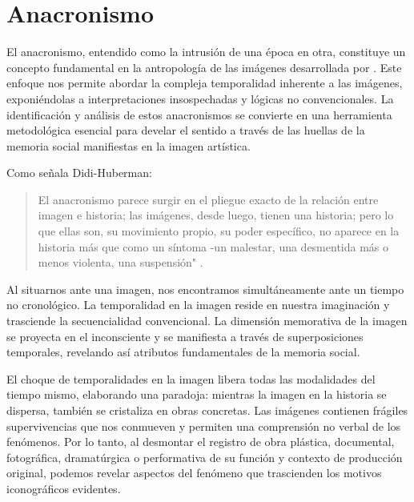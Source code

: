 \section{Anacronismo}

El anacronismo, entendido como la intrusión de una época en otra, constituye un concepto fundamental en la antropología de las imágenes desarrollada por \parencite{DidiHuberman2011}. Este enfoque nos permite abordar la compleja temporalidad inherente a las imágenes, exponiéndolas a interpretaciones insospechadas y lógicas no convencionales. La identificación y análisis de estos anacronismos se convierte en una herramienta metodológica esencial para develar el sentido a través de las huellas de la memoria social manifiestas en la imagen artística.

Como señala Didi-Huberman: 

\begin{quote}
    El anacronismo parece surgir en el pliegue exacto de la relación entre imagen e historia; las imágenes, desde luego, tienen una historia; pero lo que ellas son, su movimiento propio, su poder específico, no aparece en la historia más que como un síntoma -un malestar, una desmentida más o menos violenta, una suspensión" \parencite[p. 48]{DidiHuberman2011}.
\end{quote}

Al situarnos ante una imagen, nos encontramos simultáneamente ante un tiempo no cronológico. La temporalidad en la imagen reside en nuestra imaginación y trasciende la secuencialidad convencional. La dimensión memorativa de la imagen se proyecta en el inconsciente y se manifiesta a través de superposiciones temporales, revelando así atributos fundamentales de la memoria social.

El choque de temporalidades en la imagen libera todas las modalidades del tiempo mismo, elaborando una paradoja: mientras la imagen en la historia se dispersa, también se cristaliza en obras concretas. Las imágenes contienen frágiles supervivencias que nos conmueven y permiten una comprensión no verbal de los fenómenos. Por lo tanto, al desmontar el registro de obra plástica, documental, fotográfica, dramatúrgica o performativa de su función y contexto de producción original, podemos revelar aspectos del fenómeno que trascienden los motivos iconográficos evidentes.

